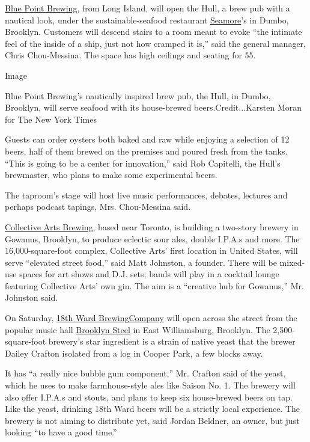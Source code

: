 \href{https://www.bluepointbrewing.com}{Blue Point Brewing}, from Long
Island, will open the Hull, a brew pub with a nautical look, under the
sustainable-seafood restaurant
\href{https://www.seamores.com/}{Seamore}'s in Dumbo, Brooklyn.
Customers will descend stairs to a room meant to evoke ``the intimate
feel of the inside of a ship, just not how cramped it is,'' said the
general manager, Chris Chou-Messina. The space has high ceilings and
seating for 55.

Image

Blue Point Brewing's nautically inspired brew pub, the Hull, in Dumbo,
Brooklyn, will serve seafood with its house-brewed
beers.Credit...Karsten Moran for The New York Times

Guests can order oysters both baked and raw while enjoying a selection
of 12 beers, half of them brewed on the premises and poured fresh from
the tanks. ``This is going to be a center for innovation,'' said Rob
Capitelli, the Hull's brewmaster, who plans to make some experimental
beers.

The taproom's stage will host live music performances, debates, lectures
and perhaps podcast tapings, Mrs. Chou-Messina said.

\href{https://collectiveartsbrewing.com}{Collective Arts Brewing}, based
near Toronto, is building a two-story brewery in Gowanus, Brooklyn, to
produce eclectic sour ales, double I.P.A.s and more. The
16,000-square-foot complex, Collective Arts' first location in United
States, will serve ``elevated street food,'' said Matt Johnston, a
founder. There will be mixed-use spaces for art shows and D.J. sets;
bands will play in a cocktail lounge featuring Collective Arts' own gin.
The aim is a ``creative hub for Gowanus,'' Mr. Johnston said.

On Saturday, \href{https://www.18thwardbrewing.com/}{18th Ward
Brewing}\href{https://www.18thwardbrewing.com/}{Company} will open
across the street from the popular music hall
\href{https://www.bowerypresents.com/venues/brooklyn-steel}{Brooklyn
Steel} in East Williamsburg, Brooklyn. The 2,500-square-foot brewery's
star ingredient is a strain of native yeast that the brewer Dailey
Crafton isolated from a log in Cooper Park, a few blocks away.

It has ``a really nice bubble gum component,'' Mr. Crafton said of the
yeast, which he uses to make farmhouse-style ales like Saison No. 1. The
brewery will also offer I.P.A.s and stouts, and plans to keep six
house-brewed beers on tap. Like the yeast, drinking 18th Ward beers will
be a strictly local experience. The brewery is not aiming to distribute
yet, said Jordan Beldner, an owner, but just looking ``to have a good
time.''

